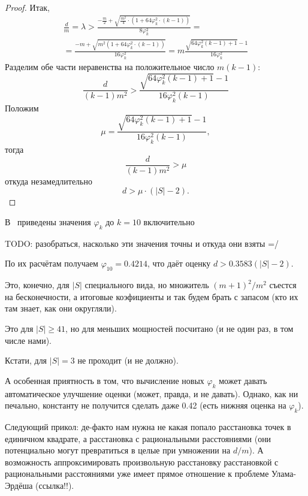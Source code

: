 \begin{proof}
	Итак,
	\begin{multline}
		\frac{d}{m} = \lambda >
		\frac{-\frac{m}{2} + \sqrt{\frac{m^2}{4} \cdot (1 + 64 \varphi_k^2 \cdot (k-1))} }{8 \varphi_k^2}
		=\\=
		\frac{-m + \sqrt{m^2  (1 + 64 \varphi_k^2 \cdot (k-1))} }{16 \varphi_k^2}
		=
		m\frac{ \sqrt{ 64 \varphi_k^2 (k-1) + 1} -1 }{16 \varphi_k^2}
	\end{multline}
	Разделим обе части неравенства на положительное число $m(k-1)$:
	\begin{equation}
		\frac{d}{(k-1)m^2}
		>
		\frac{ \sqrt{ 64 \varphi_k^2 (k-1) + 1} -1 }{16 \varphi_k^2 (k-1)}
	\end{equation}
	Положим
	\begin{equation}
		\mu = \frac{ \sqrt{ 64 \varphi_k^2 (k-1) + 1} -1 }{16 \varphi_k^2 (k-1)},
	\end{equation}
	тогда
	\begin{equation}
		\frac{d}{(k-1)m^2}
		>
		\mu
	\end{equation}
	откуда незамедлительно
	\begin{equation}
		d > \mu \cdot (|S|-2)
		.
	\end{equation}
\end{proof}


В~\cite{costa2013valid} приведены значения $\varphi_k$ до $k=10$ включительно

TODO: разобраться, насколько эти значения точны и откуда они взяты =/

По их расчётам получаем $\varphi_{10} = 0.4214$,
что даёт оценку $d>0.3583(|S|-2)$.

Это, конечно, для $|S|$ специального вида, но множитель $(m+1)^2 / m^2$ съестся на бесконечности,
а итоговые коэфициенты и так будем брать с запасом (кто их там знает, как они округляли).

Это для $|S| \geq 41$, но для меньших мощностей посчитано (и не один раз, в том числе нами).

Кстати, для $|S| = 3$ не проходит (и не должно).

А особенная приятность в том, что вычисление новых $\varphi_k$ может давать автоматическое улучшение оценки
(может, правда, и не давать).
Однако, как ни печально, константу не получится сделать даже 0.42 (есть нижняя оценка на $\varphi_k$).

Следующий прикол:
де-факто нам нужна не какая попало расстановка точек в единичном квадрате,
а расстановка с рациональными расстояниями (они потенциально могут превратиться в целые при умножении на $d/m$).
А возможность аппроксимировать произвольную расстановку расстановкой с рациональными расстояниями
уже имеет прямое отношение к проблеме Улама-Эрдёша (ссылка!!).
